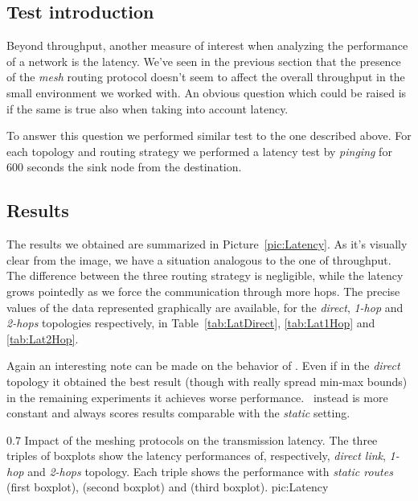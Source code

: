 \clearpage
\subsection{Test introduction}
    Beyond throughput, another measure of interest when analyzing the
    performance of a network is the latency. We've seen in the
    previous section that the presence of the \emph{mesh} routing
    protocol doesn't seem to affect the overall throughput in the small
    environment we worked with. An obvious question which could be
    raised is if the same is true also when taking into account latency.

    To answer this question we performed similar test to the one
    described above. For each topology and routing strategy we
    performed a latency test by \emph{pinging} for 600 seconds the sink
    node from the destination.

\subsection{Results}

    The results we obtained are summarized in
    Picture~\ref{pic:Latency}. As it's visually clear from the image, we
    have a situation analogous to the one of throughput. The difference
    between the three routing strategy is negligible, while the latency
    grows pointedly as we force the communication through more hops.
    The precise values of the data represented graphically are available,
    for the \emph{direct}, \emph{1-hop} and \emph{2-hops} topologies
    respectively, in Table~\ref{tab:LatDirect}, \ref{tab:Lat1Hop} and
    \ref{tab:Lat2Hop}.

    Again an interesting note can be made on the behavior of \olsr. Even
    if in the \emph{direct} topology it obtained the best result (though
    with really spread min-max bounds) in the remaining experiments it
    achieves worse performance. \batman\ instead is more constant and
    always scores results comparable with the \emph{static} setting.

        {0.7 \columnwidth}
        {Impact of the meshing protocols on the transmission latency. The
         three triples of boxplots show the latency performances of,
         respectively, \emph{direct link}, \emph{1-hop} and \emph{2-hops}
         topology. Each triple shows the performance with \emph{static
         routes} (first boxplot), \emph{\batman} (second boxplot) and
         \emph{\olsr} (third boxplot).}
        {pic:Latency}

